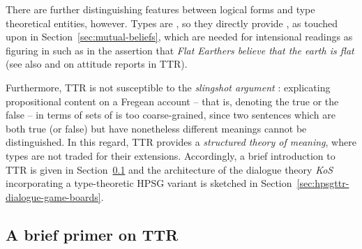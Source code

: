 \documentclass[output=paper,biblatex,babelshorthands,newtxmath,draftmode,colorlinks,citecolor=brown]{langscibook}
\begin{document}
There are further distinguishing features between logical forms and type theoretical entities, however.
%
Types are , so they directly provide , as touched upon in Section~\ref{sec:mutual-beliefs}, which are needed for intensional readings as figuring in  such as in the assertion that \textit{Flat Earthers believe that the earth is flat} (see also \citealt{Cooper:2005:b} and \citealt{Cooper:ms} on attitude reports in TTR).


Furthermore, TTR is not susceptible to the \emph{slingshot argument} \citep[--26]{Barwise:Perry:1983}: explicating propositional content on a Fregean account \citep{Frege:1892} -- that is, denoting the true or the false -- in terms of sets of  is too coarse-grained, since two sentences which are both true (or false) but have nonetheless different meanings cannot be distinguished.
%
In this regard, TTR provides a \emph{structured theory of meaning}, where types are not traded for their extensions.
%
Accordingly, a brief introduction to TTR is given in Section~\ref{sec:brief-primer-ttr} and the architecture of the dialogue theory \emph{KoS} incorporating a type-theoretic HPSG variant is sketched in Section~\ref{sec:hpsgttr-dialogue-game-boards}.




\subsection{A brief primer on TTR}
\label{sec:brief-primer-ttr}
\end{document}
